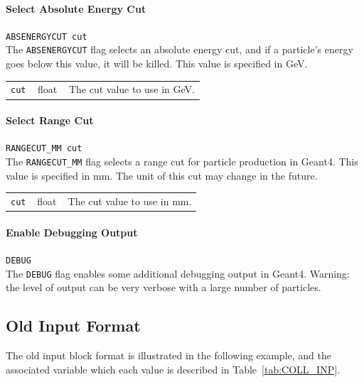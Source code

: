 \paragraph{Select Absolute Energy Cut} \texttt{ABSENERGYCUT cut}\\

The \texttt{ABSENERGYCUT} flag selects an absolute energy cut, and if a particle's energy goes below this value, it will be killed.
This value is specified in GeV.

\bigskip
\begin{tabular}{@{}llp{0.7\linewidth}}
    \texttt{cut} & float    & The cut value to use in GeV.
\end{tabular}

\paragraph{Select Range Cut} \texttt{RANGECUT\_MM cut}\\

The \texttt{RANGECUT\_MM} flag selects a range cut for particle production in Geant4.
This value is specified in mm.
The unit of this cut may change in the future.

\bigskip
\begin{tabular}{@{}llp{0.7\linewidth}}
    \texttt{cut} & float    & The cut value to use in mm.
\end{tabular}

\paragraph{Enable Debugging Output} \texttt{DEBUG}\\

The \texttt{DEBUG} flag enables some additional debugging output in Geant4.
Warning: the level of output can be very verbose with a large number of particles.


\subsection{Old Input Format}\label{sec:coll:oldfmt}

The old input block format is illustrated in the following example, and the associated variable which each value is described in Table~\ref{tab:COLL_INP}.

